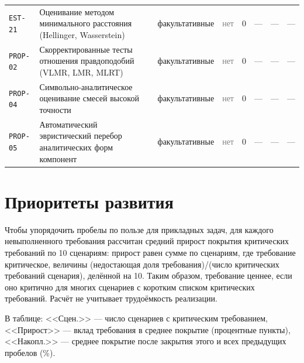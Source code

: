 \documentclass[10pt,a4paper]{article}
\begin{document}
\begin{landscape}
{\begin{longtable}{@{}l >{\raggedright\arraybackslash}p{8.2cm} l l r r r >{\raggedright\arraybackslash}p{6.2cm}@{}}
\texttt{EST-21} & Оценивание методом минимального расстояния (Hellinger, Wasserstein) & факультативные & \textcolor{gray}{нет} & 0 & --- & --- & --- \\
\texttt{PROP-02} & Скорректированные тесты отношения правдоподобий (VLMR, LMR, MLRT) & факультативные & \textcolor{gray}{нет} & 0 & --- & --- & --- \\
\texttt{PROP-04} & Символьно-аналитическое оценивание смесей высокой точности & факультативные & \textcolor{gray}{нет} & 0 & --- & --- & --- \\
\texttt{PROP-05} & Автоматический эвристический перебор аналитических форм компонент & факультативные & \textcolor{gray}{нет} & 0 & --- & --- & --- \\
\bottomrule
\end{longtable}}

\end{landscape}
\section{Приоритеты развития}\label{sec:roadmap}
Чтобы упорядочить пробелы по пользе для прикладных задач, для каждого невыполненного требования рассчитан средний прирост покрытия критических требований по 10 сценариям:
прирост равен сумме по сценариям, где требование критическое, величины (недостающая доля требования)/(число критических требований сценария), делённой на 10.
Таким образом, требование ценнее, если оно критично для многих сценариев с коротким списком критических требований. Расчёт не учитывает трудоёмкость реализации.

В таблице: <<Сцен.>> --- число сценариев с критическим требованием, <<Прирост>> --- вклад требования в среднее покрытие (процентные пункты), <<Накопл.>> --- среднее покрытие после закрытия этого и всех предыдущих пробелов (\%).
\end{document}

